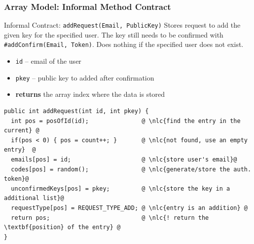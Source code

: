 \documentclass{beamer}
\begin{document}


\begin{frame}[fragile]
    \frametitle{Array Model: Informal Method Contract}
    \begin{block}{Informal Contract: \texttt{addRequest(Email, PublicKey)}}
      Stores request to add the given key for the specified user. The key still
      needs to be confirmed with \texttt{\#addConfirm(Email, Token)}. Does nothing if
      the specified user does not exist.
     
    \begin{itemize}
      \item \texttt{id} -- email of the user
      \item \texttt{pkey} -- public key to added after confirmation
      \item \textbf{returns} the array index where the data is stored
    \end{itemize}
     
    \end{block}

    \newcommand{\nlc}[1]{\textcolor{green!60!black}{// #1}}

    \begin{lstlisting}[escapechar=@]
public int addRequest(int id, int pkey) {
  int pos = posOfId(id);               @ \nlc{find the entry in the current} @
  if(pos < 0) { pos = count++; }       @ \nlc{not found, use an empty entry}  @
  emails[pos] = id;                    @ \nlc{store user's email}@
  codes[pos] = random();               @ \nlc{generate/store the auth. token}@
  unconfirmedKeys[pos] = pkey;         @ \nlc{store the key in a additional list}@
  requestType[pos] = REQUEST_TYPE_ADD; @ \nlc{entry is an addition} @
  return pos;                          @ \nlc{! return the \textbf{position} of the entry} @
}\end{lstlisting}

\end{frame}
\end{document}
